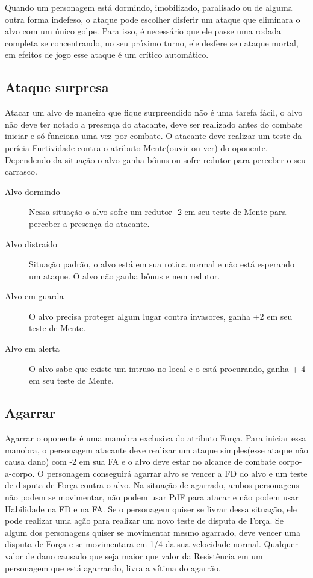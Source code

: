 Quando um personagem está dormindo, imobilizado, paralisado ou de alguma outra forma indefeso, o ataque pode escolher disferir um ataque que eliminara o alvo com um único golpe. Para isso, é necessário que ele passe uma rodada completa se concentrando, no seu próximo turno, ele desfere seu ataque mortal, em efeitos de jogo esse ataque é um crítico automático.

\subsection{Ataque surpresa}

Atacar um alvo de maneira que fique surpreendido não é uma tarefa fácil, o alvo não deve ter notado a presença do atacante, deve ser realizado antes do combate iniciar e só funciona uma vez por combate. O atacante deve realizar um teste da perícia Furtividade contra o atributo Mente(ouvir ou ver) do oponente. Dependendo da situação o alvo ganha bônus ou sofre redutor para perceber o seu carrasco.

\begin{description}
\item[Alvo dormindo] Nessa situação o alvo sofre um redutor -2 em seu teste de Mente para perceber a presença do atacante.
\item[Alvo distraído] Situação padrão, o alvo está em sua rotina normal e não está esperando um ataque. O alvo não ganha bônus e nem redutor.
\item[Alvo em guarda] O alvo precisa proteger algum lugar contra invasores, ganha +2 em seu teste de Mente.
\item[Alvo em alerta] O alvo sabe que existe um intruso no local e o está procurando, ganha + 4 em seu teste de Mente.
\end{description}

\subsection{Agarrar}

Agarrar o oponente é uma manobra exclusiva do atributo Força. Para iniciar essa manobra, o personagem atacante deve realizar um ataque simples(esse ataque não causa dano) com -2 em sua FA e o alvo deve estar no alcance de combate corpo-a-corpo. O personagem conseguirá agarrar alvo se vencer a FD do alvo e um teste de disputa de Força contra o alvo. Na situação de agarrado, ambos personagens não podem se movimentar, não podem usar PdF para atacar e não podem usar Habilidade na FD e na FA. Se o personagem quiser se livrar dessa situação, ele pode realizar uma ação para realizar um novo teste de disputa de Força. Se algum dos personagens quiser se movimentar mesmo agarrado, deve vencer uma disputa de Força e se movimentara em 1/4 da sua velocidade normal. Qualquer valor de dano causado que seja maior que valor da Resistência em um personagem que está agarrando, livra a vítima do agarrão. 

